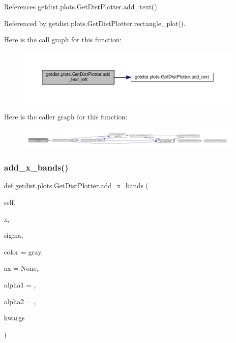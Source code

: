 References getdist.\+plots.\+Get\+Dist\+Plotter.\+add\+\_\+text().



Referenced by getdist.\+plots.\+Get\+Dist\+Plotter.\+rectangle\+\_\+plot().

Here is the call graph for this function\+:
\nopagebreak
\begin{figure}[H]
\begin{center}
\leavevmode
\includegraphics[width=350pt]{classgetdist_1_1plots_1_1GetDistPlotter_af147d1c8013996cd850d66e5c2b82df7_cgraph}
\end{center}
\end{figure}
Here is the caller graph for this function\+:
\nopagebreak
\begin{figure}[H]
\begin{center}
\leavevmode
\includegraphics[width=350pt]{classgetdist_1_1plots_1_1GetDistPlotter_af147d1c8013996cd850d66e5c2b82df7_icgraph}
\end{center}
\end{figure}
\mbox{\label{classgetdist_1_1plots_1_1GetDistPlotter_aea02dc90ffea867b3c35d641451309ce}} 
\subsubsection{\texorpdfstring{add\+\_\+x\+\_\+bands()}{add\_x\_bands()}}
{\footnotesize\ttfamily def getdist.\+plots.\+Get\+Dist\+Plotter.\+add\+\_\+x\+\_\+bands (\begin{DoxyParamCaption}\item[{}]{self,  }\item[{}]{x,  }\item[{}]{sigma,  }\item[{}]{color = {\ttfamily \textquotesingle{}gray\textquotesingle{}},  }\item[{}]{ax = {\ttfamily None},  }\item[{}]{alpha1 = {},  }\item[{}]{alpha2 = {},  }\item[{}]{kwargs }\end{DoxyParamCaption})}


